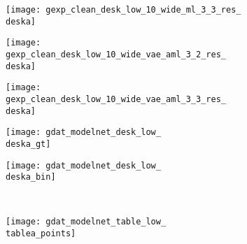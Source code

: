 \begin{figure*}[t]
{\begin{subfigure}[t]{1\textwidth}
\begin{subfigure}[t]{0.095\textwidth}
        \end{subfigure}
   		\begin{subfigure}[t]{0.095\textwidth}
   			\vspace{0px}\centering
   			\texttt{[image: gexp\_clean\_desk\_low\_10\_wide\_ml\_3\_3\_res\_\\deska]}
   		\end{subfigure}
   		\begin{subfigure}[t]{0.095\textwidth}
   			\vspace{0px}\centering
   			\texttt{[image: gexp\_clean\_desk\_low\_10\_wide\_vae\_aml\_3\_2\_res\_\\deska]}
   		\end{subfigure}
   		\begin{subfigure}[t]{0.095\textwidth}
   			\vspace{0px}\centering
   			\texttt{[image: gexp\_clean\_desk\_low\_10\_wide\_vae\_aml\_3\_3\_res\_\\deska]}
   		\end{subfigure}
   		\begin{subfigure}[t]{0.095\textwidth}
   			\vspace{0px}\centering
   			\texttt{[image: gdat\_modelnet\_desk\_low\_\\deska\_gt]}
   		\end{subfigure}
   		\begin{subfigure}[t]{0.095\textwidth}
   			\vspace{0px}\centering
   			\texttt{[image: gdat\_modelnet\_desk\_low\_\\deska\_bin]}
   		\end{subfigure}
   		\\[2px]
   		\begin{subfigure}[t]{0.095\textwidth}
   			\vspace{0px}\centering
   			\texttt{[image: gdat\_modelnet\_table\_low\_\\tablea\_points]}
   		\end{subfigure}
   		\begin{subfigure}[t]{0.095\textwidth}

\end{subfigure}
\end{subfigure}}
\end{figure*}
